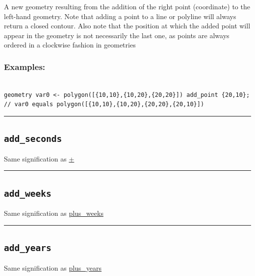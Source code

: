 \documentclass[]{book}
\theoremstyle{definition}
\theoremstyle{definition}
\theoremstyle{definition}
\theoremstyle{remark}
\begin{document}
A new geometry resulting from the addition of the right point
(coordinate) to the left-hand geometry. Note that adding a point to a
line or polyline will always return a closed contour. Also note that the
position at which the added point will appear in the geometry is not
necessarily the last one, as points are always ordered in a clockwise
fashion in geometries

\subsubsection{Examples:}\label{examples-17}

\begin{verbatim}
 
geometry var0 <- polygon([{10,10},{10,20},{20,20}]) add_point {20,10}; // var0 equals polygon([{10,10},{10,20},{20,20},{20,10}])
\end{verbatim}

\begin{center}\rule{0.5\linewidth}{\linethickness}\end{center}

\subsection{\texorpdfstring{\texttt{add\_seconds}}{add\_seconds}}\label{add_seconds}

Same signification as \href{operators-a-to-a.html\#+}{+}

\begin{center}\rule{0.5\linewidth}{\linethickness}\end{center}

\subsection{\texorpdfstring{\texttt{add\_weeks}}{add\_weeks}}\label{add_weeks}

Same signification as
\href{operators-n-to-r.html\#plus_weeks}{plus\_weeks}

\begin{center}\rule{0.5\linewidth}{\linethickness}\end{center}

\subsection{\texorpdfstring{\texttt{add\_years}}{add\_years}}\label{add_years}

Same signification as
\href{operators-n-to-r.html\#plus_years}{plus\_years}
\end{document}

